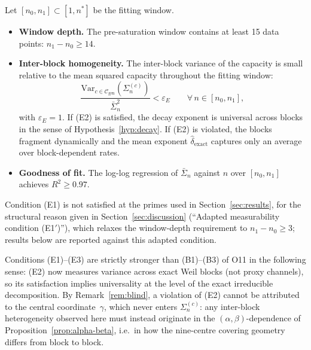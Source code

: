     \begin{definition}
      \label{def:conditions}
      Let $[n_0,n_1]\subset[1,n^*]$ be the fitting window.
      \begin{itemize}
        \item[\textbf{(E1)}] \textbf{Window depth.}
        The pre-saturation window contains at least 15 data points: $n_1 - n_0 \geq 14$.
        \item[\textbf{(E2)}] \textbf{Inter-block homogeneity.}
        The inter-block variance of the capacity is small relative to the mean squared capacity
        throughout the fitting window:
        \begin{equation}
          \frac{\mathrm{Var}_{c\in\mathcal{C}_{\mathrm{gen}}}(\Sigma_n^{(c)})}{\bar{\Sigma}_n^2}
          < \varepsilon_E
          \qquad \forall\,n\in[n_0,n_1],
        \end{equation}
        with $\varepsilon_E = 1$.
        If (E2) is satisfied, the decay exponent is universal across blocks in the sense of
        Hypothesis~\ref{hyp:decay}.
        If (E2) is violated, the blocks fragment dynamically and the mean exponent
        $\hat{\delta}_{\mathrm{exact}}$ captures only an average over block-dependent rates.
        \item[\textbf{(E3)}] \textbf{Goodness of fit.}
        The log-log regression of $\bar{\Sigma}_n$ against $n$ over $[n_0,n_1]$ achieves
        $R^2\geq 0.97$.
      \end{itemize}
    \end{definition}

    Condition (E1) is not satisfied at the primes used in Section~\ref{sec:results}, for the
    structural reason given in Section~\ref{sec:discussion} (``Adapted measurability
    condition (E1$'$)''), which relaxes the window-depth requirement to
    $n_1-n_0\geq 3$; results below are reported against this adapted condition.

    Conditions (E1)--(E3) are strictly stronger than (B1)--(B3) of O11 in the following sense:
    (E2) now measures variance across exact Weil blocks (not proxy channels), so its
    satisfaction implies universality at the level of the exact irreducible decomposition.
    By Remark~\ref{rem:blind}, a violation of (E2) cannot be attributed to the central
    coordinate~$\gamma$, which never enters $\Sigma_n^{(c)}$: any inter-block heterogeneity
    observed here must instead originate in the $(\alpha,\beta)$-dependence of
    Proposition~\ref{prop:alpha-beta}, i.e.\ in how the nine-centre covering geometry differs
    from block to block.

